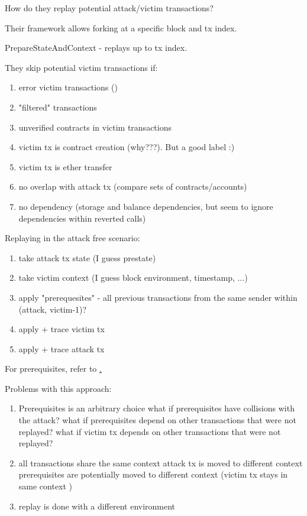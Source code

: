 \documentclass[draft,final]{vutinfth} %
\begin{document}
How do they replay potential attack/victim transactions?

Their framework allows forking at a specific block and tx index.

PrepareStateAndContext - replays up to tx index.


They skip potential victim transactions if:

\begin{enumerate}
    \item error victim transactions ()
    \item "filtered" transactions 
    \item unverified contracts in victim transactions
    \item victim tx is contract creation (why???). But a good label :)
    \item victim tx is ether transfer
    \item no overlap with attack tx (compare sets of contracts/accounts)
    \item no dependency (storage and balance dependencies, but seem to ignore dependencies within reverted calls)
\end{enumerate}

Replaying in the attack free scenario:

\begin{enumerate}
    \item take attack tx state (I guess prestate)
    \item take victim context (I guess block environment, timestamp, ...)
    \item apply "prerequesites" - all previous transactions from the same sender within (attack, victim-1)?
    \item apply + trace victim tx
    \item apply + trace attack tx
\end{enumerate}

For prerequisites, refer to \href{https://github.com/Troublor/erebus-redgiant/blob/4544163f0c6a369b35c3237851f482d240fa7bbd/dataset/tx_history_test.go#L42-L53}.

Problems with this approach:

\begin{enumerate}
    \item Prerequisites is an arbitrary choice
          \subitem what if prerequisites have collisions with the attack?
          \subitem what if prerequisites depend on other transactions that were not replayed?
          \subitem what if victim tx depends on other transactions that were not replayed?
    \item all transactions share the same context
          \subitem attack tx is moved to different context
          \subitem prerequisites are potentially moved to different context
          \subitem (victim tx stays in same context \checkmark)
    \item replay is done with a different environment
\end{enumerate}
\end{document}
